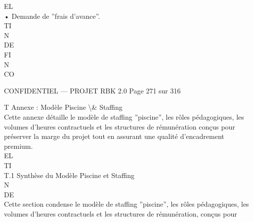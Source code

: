 \documentclass[12pt,landscape,a4paper]{article}
\newenvironment{confidential}
{\begin{tcolorbox}[
    colback=rbkred!5!white,
    colframe=rbkred!75!black,
    title=CONFIDENTIEL,
    fonttitle=\bfseries\color{white},
    coltitle=rbkred!75!black,
    breakable,
    enhanced,
    frame hidden,
    borderline west={2pt}{0pt}{rbkred!75!black}
]}
{\end{tcolorbox}}
\begin{document}
\vspace{0.5em}
\vspace{0.5em}
\vspace{0.5em}
EL\\
• Demande de ”frais d’avance”.\\
\vspace{0.5em}
\vspace{0.5em}
\vspace{0.5em}
\vspace{0.5em}
TI\\
N\\
DE\\
FI\\
N\\
CO\\
\vspace{0.5em}
\vspace{0.5em}
\vspace{0.5em}
\vspace{0.5em}
\begin{confidential}CONFIDENTIEL — PROJET RBK 2.0                                    Page 271 sur 316\end{confidential}
T \textbar{} Annexe : Modèle Piscine \textbackslash{}& Staffing\\
\vspace{0.5em}
\vspace{0.5em}
Cette annexe détaille le modèle de staffing ”piscine”, les rôles pédagogiques, les volumes d’heures contractuels et les structures de rémunération conçus pour\\
préserver la marge du projet tout en assurant une qualité d’encadrement premium.\\
\vspace{0.5em}
\vspace{0.5em}
\vspace{0.5em}
\vspace{0.5em}
EL\\
TI\\
T.1 Synthèse du Modèle Piscine et Staffing\\
\vspace{0.5em}
\vspace{0.5em}
\vspace{0.5em}
\vspace{0.5em}
N\\
DE\\
Cette section condense le modèle de staffing ”piscine”, les rôles pédagogiques, les volumes d’heures contractuels et les structures de rémunération, conçus pour\\
\end{document}

